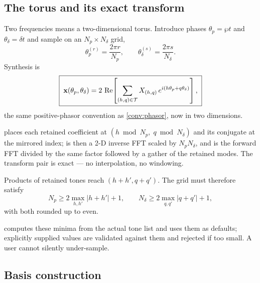 \subsection{The torus and its exact transform}

Two frequencies means a two-dimensional torus. Introduce phases
$\theta_p = \wp t$ and $\theta_\delta = \delta t$ and sample on an
$N_p\times N_\delta$ grid,
\begin{equation}
  \theta_p^{(r)} = \frac{2\pi r}{N_p},
  \qquad
  \theta_\delta^{(s)} = \frac{2\pi s}{N_\delta}.
\end{equation}
Synthesis is
\begin{equation}
  \boxed{\;
  \mathbf{x}(\theta_p,\theta_\delta)
  = 2\,\operatorname{Re}\!\left[\sum_{(h,q)\in\mathcal{T}}
      X_{(h,q)}\,e^{i(h\theta_p + q\theta_\delta)}\right],
  \;}
  \label{eq:torus-synthesis}
\end{equation}
the same positive-phasor convention as \cref{conv:phasor}, now in two
dimensions.

\begin{implnote}
 places each retained coefficient at
$(h \bmod N_p,\; q \bmod N_\delta)$ and its conjugate at the mirrored index;
 is then a 2-D inverse FFT scaled by $N_pN_\delta$, and
 is the forward FFT divided by the same factor followed by a
gather of the retained modes. The transform pair is exact --- no interpolation,
no windowing.
\end{implnote}

\begin{proposition}
Products of retained tones reach $(h+h', q+q')$. The grid must therefore satisfy
\begin{equation}
  N_p \ge 2\max_{h,h'}|h+h'| + 1,
  \qquad
  N_\delta \ge 2\max_{q,q'}|q+q'| + 1,
\end{equation}
with both rounded up to even.
\end{proposition}

\begin{implnote}
 computes these minima from the actual
tone list and uses them as defaults; explicitly supplied values are validated
against them and rejected if too small. A user cannot silently under-sample.
\end{implnote}

\subsection{Basis construction}

